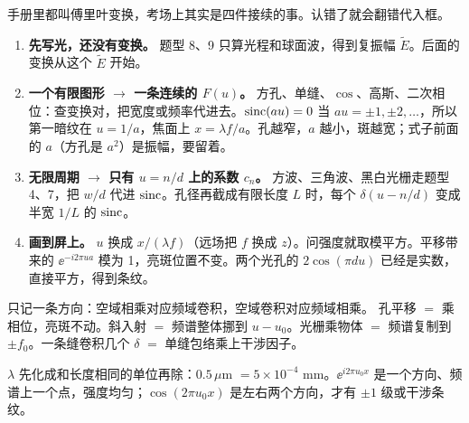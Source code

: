 \begin{idea}[做题前先认是下面哪一件]
手册里都叫傅里叶变换，考场上其实是四件接续的事。认错了就会翻错代入框。
\begin{enumerate}
\item \textbf{先写光，还没有变换。} 题型 8、9 只算光程和球面波，得到复振幅 $\tilde E$。后面的变换从这个 $\tilde E$ 开始。
\item \textbf{一个有限图形 $\to$ 一条连续的 $F(u)$。} 方孔、单缝、$\cos$、高斯、二次相位：查变换对，把宽度或频率代进去。$\operatorname{sinc}(au)=0$ 当 $au=\pm1,\pm2,\dots$，所以第一暗纹在 $u=1/a$，焦面上 $x=\lambda f/a$。孔越窄，$a$ 越小，斑越宽；式子前面的 $a$（方孔是 $a^2$）是振幅，要留着。
\item \textbf{无限周期 $\to$ 只有 $u=n/d$ 上的系数 $c_n$。} 方波、三角波、黑白光栅走题型 4、7，把 $w/d$ 代进 $\operatorname{sinc}$。孔径再截成有限长度 $L$ 时，每个 $\delta(u-n/d)$ 变成半宽 $1/L$ 的 $\operatorname{sinc}$。
\item \textbf{画到屏上。} $u$ 换成 $x/(\lambda f)$（远场把 $f$ 换成 $z$）。问强度就取模平方。平移带来的 $\ee^{-i2\pi ua}$ 模为 1，亮斑位置不变。两个光孔的 $2\cos(\pi du)$ 已经是实数，直接平方，得到条纹。
\end{enumerate}
只记一条方向：空域相乘对应频域卷积，空域卷积对应频域相乘。
孔平移 $=$ 乘相位，亮斑不动。斜入射 $=$ 频谱整体挪到 $u-u_0$。光栅乘物体 $=$ 频谱复制到 $\pm f_0$。一条缝卷积几个 $\delta$ $=$ 单缝包络乘上干涉因子。

$\lambda$ 先化成和长度相同的单位再除：$0.5\,\mu$m $=5\times10^{-4}$ mm。$\ee^{i2\pi u_0x}$ 是一个方向、频谱上一个点，强度均匀；$\cos(2\pi u_0x)$ 是左右两个方向，才有 $\pm1$ 级或干涉条纹。
\end{idea}

